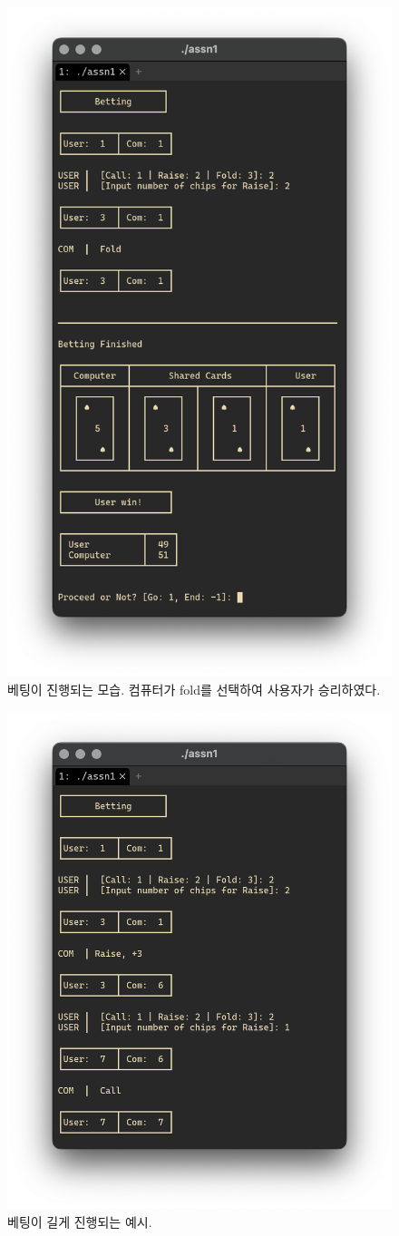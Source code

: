 \documentclass[titlepage]{article}
\begin{document}
\begin{figure}[H]
  \centering
  \includegraphics[width=0.6\linewidth]{betting.png}
  \caption{베팅이 진행되는 모습. 컴퓨터가 fold를 선택하여 사용자가 승리하였다.}
\end{figure}

\begin{figure}[H]
  \centering
  \includegraphics[width=0.6\linewidth]{betting-long.png}
  \caption{베팅이 길게 진행되는 예시.}
\end{figure}
\end{document}
